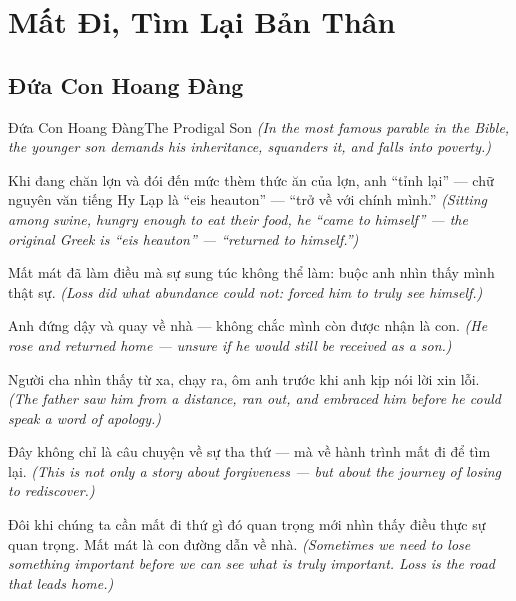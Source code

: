 \chapter{Mất Đi, Tìm Lại Bản Thân}

\section{Đứa Con Hoang Đàng}
\begin{truyen}{Đứa Con Hoang Đàng}{The Prodigal Son}
\textit{(In the most famous parable in the Bible, the younger son demands his inheritance, squanders it, and falls into poverty.)}

Khi đang chăn lợn và đói đến mức thèm thức ăn của lợn, anh ``tỉnh lại'' — chữ nguyên văn tiếng Hy Lạp là ``eis heauton'' — ``trở về với chính mình.''
\textit{(Sitting among swine, hungry enough to eat their food, he ``came to himself'' — the original Greek is ``eis heauton'' — ``returned to himself.'')}

Mất mát đã làm điều mà sự sung túc không thể làm: buộc anh nhìn thấy mình thật sự.
\textit{(Loss did what abundance could not: forced him to truly see himself.)}

Anh đứng dậy và quay về nhà — không chắc mình còn được nhận là con.
\textit{(He rose and returned home — unsure if he would still be received as a son.)}

Người cha nhìn thấy từ xa, chạy ra, ôm anh trước khi anh kịp nói lời xin lỗi.
\textit{(The father saw him from a distance, ran out, and embraced him before he could speak a word of apology.)}

Đây không chỉ là câu chuyện về sự tha thứ — mà về hành trình mất đi để tìm lại.
\textit{(This is not only a story about forgiveness — but about the journey of losing to rediscover.)}

\end{truyen}

\begin{baihoc}
Đôi khi chúng ta cần mất đi thứ gì đó quan trọng mới nhìn thấy điều thực sự quan trọng. Mất mát là con đường dẫn về nhà.
\textit{(Sometimes we need to lose something important before we can see what is truly important. Loss is the road that leads home.)}
\end{baihoc}
\ngancach

